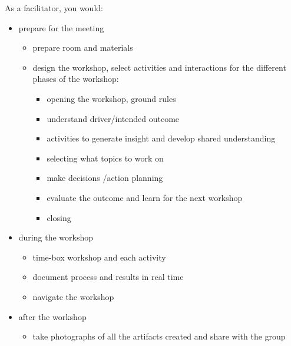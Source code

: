 As a facilitator, you would:

\begin{itemize}
\item prepare for the meeting

\begin{itemize}
\item prepare room and materials

\item design the workshop, select activities and interactions for the different phases of the workshop:

\begin{itemize}
\item opening the workshop, ground rules

\item understand driver\slash intended outcome

\item activities to generate insight and develop shared understanding

\item selecting what topics to work on

\item make decisions \slash  action planning

\item evaluate the outcome and learn for the next workshop

\item closing

\end{itemize}

\end{itemize}

\item during the workshop

\begin{itemize}
\item time-box workshop and each activity

\item document process and results in real time

\item navigate the workshop

\end{itemize}

\item after the workshop

\begin{itemize}
\item take photographs of all the artifacts created and share with the group

\end{itemize}

\end{itemize}

